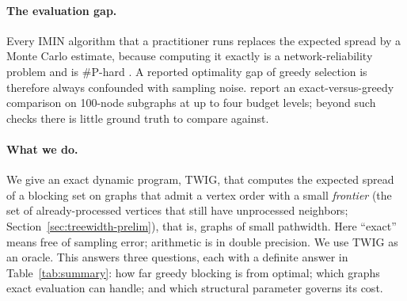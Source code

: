 \documentclass[11pt]{article}
\theoremstyle{definition}
\theoremstyle{remark}
\begin{document}
\paragraph{The evaluation gap.} Every IMIN algorithm that a practitioner runs replaces the expected spread by a Monte Carlo estimate, because computing it exactly is a network-reliability problem and is \#P-hard \citep{valiant1979,provan1983}. A reported optimality gap of greedy selection is therefore always confounded with sampling noise. \citet{xie2024} report an exact-versus-greedy comparison on 100-node subgraphs at up to four budget levels; beyond such checks there is little ground truth to compare against.

\paragraph{What we do.} We give an exact dynamic program, TWIG, that computes the expected spread of a blocking set on graphs that admit a vertex order with a small \emph{frontier} (the set of already-processed vertices that still have unprocessed neighbors; Section~\ref{sec:treewidth-prelim}), that is, graphs of small pathwidth. Here ``exact'' means free of sampling error; arithmetic is in double precision. We use TWIG as an oracle. This answers three questions, each with a definite answer in Table~\ref{tab:summary}: how far greedy blocking is from optimal; which graphs exact evaluation can handle; and which structural parameter governs its cost.
\end{document}
